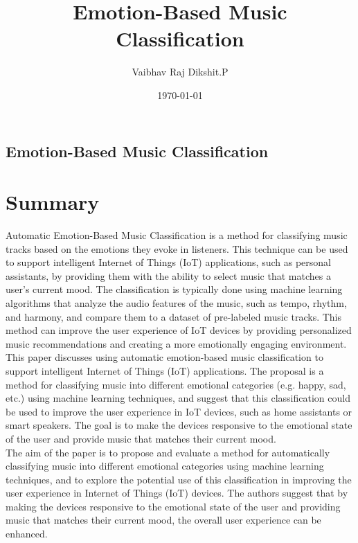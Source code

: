 \documentclass{report}
\title{Emotion-Based Music Classification}
\author{Vaibhav Raj Dikshit.P}
\date{\today}
\begin{document}
    
    
    \begin{center}
        \section*{Emotion-Based Music Classification}
    \end{center}
\setlength{\columnsep}{1.0cm}
    \large
    \section{Summary}
    Automatic Emotion-Based Music Classification is a method for classifying music tracks based on the emotions they evoke in listeners. This technique can be used to support intelligent Internet of Things (IoT) applications, such as personal assistants, by providing them with the ability to select music that matches a user's current mood. The classification is typically done using machine learning algorithms that analyze the audio features of the music, such as tempo, rhythm, and harmony, and compare them to a dataset of pre-labeled music tracks. This method can improve the user experience of IoT devices by providing personalized music recommendations and creating a more emotionally engaging environment.\\
    
    This paper discusses using automatic emotion-based music classification to support intelligent Internet of Things (IoT) applications. The proposal is a method for classifying music into different emotional categories (e.g. happy, sad, etc.) using machine learning techniques, and suggest that this classification could be used to improve the user experience in IoT devices, such as home assistants or smart speakers. The goal is to make the devices responsive to the emotional state of the user and provide music that matches their current mood.\\
    
   The aim of the paper  is to propose and evaluate a method for automatically classifying music into different emotional categories using machine learning techniques, and to explore the potential use of this classification in improving the user experience in Internet of Things (IoT) devices. The authors suggest that by making the devices responsive to the emotional state of the user and providing music that matches their current mood, the overall user experience can be enhanced. 
\end{document}
